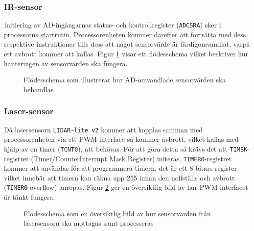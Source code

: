\documentclass[11pt]{article}
\begin{document}
\begin{flushleft}
\subsubsection{IR-sensor}
Initiering av AD-ingångarnas status- och kontrollregister (\verb+ADCSRA+) sker i processorns startrutin. Processorenheten kommer därefter att fortsätta med dess respektive instruktioner tills dess att något sensorvärde är färdigomvandlat, varpå ett avbrott kommer att kallas. Figur \ref{Avbrott_ADC} visar ett flödesschema vilket beskriver hur hanteringen av sensorvärden ska fungera.


\begin{figure}[htbp]
\centering
\noindent\resizebox{.5\linewidth}{!}{
	}
	\caption{Flödesschema som illustrerar hur AD-omvandlade sensorvärden ska behandlas\label{Avbrott_ADC}}	
\end{figure}


\FloatBarrier
\subsubsection{Laser-sensor}
Då lasersensorn \verb+LIDAR-lite v2+ kommer att kopplas samman med processorenheten via ett PWM-interface så kommer avbrott, vilket kallas med hjälp av en timer (\verb+TCNT0+), att behövas. För att göra detta så krävs det att \verb+TIMSK+-registret (Timer/CounterInterrupt Mask Register) initeras. \verb+TIMER0+-registret kommer att användas för att programmera timern, det är ett 8-bitars register vilket innebär att timern kan räkna upp 255 innan den nollställs och avbrott (\verb+TIMER0+ overflow) anropas. Figur \ref{Avbrott_PWM} ger en översiktlig bild av hur PWM-interfacet är tänkt fungera.
\begin{figure}[htbp]
\centering
\noindent\resizebox{.5\linewidth}{!}{
	}
	\caption{Flödesschema som en översiktlig bild av hur sensorvärden från lasersensorn ska mottagas samt processeras \label{Avbrott_PWM}}	
\end{figure}
\pagebreak



\end{flushleft}
\end{document}
